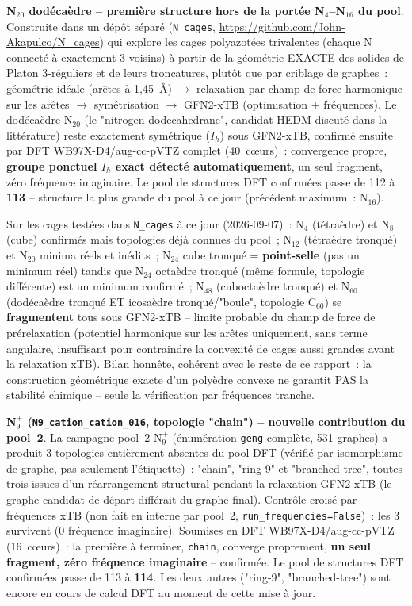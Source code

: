 \documentclass[11pt,a4paper]{article}
\begin{document}
\textbf{N$_{20}$ dod\'eca\`edre -- premi\`ere structure hors de la
port\'ee N$_4$--N$_{16}$ du pool}. Construite dans un d\'ep\^ot s\'epar\'e
(\texttt{N\_cages}, \url{https://github.com/John-Akapulco/N_cages}) qui
explore les cages polyazot\'ees trivalentes (chaque N connect\'e \`a
exactement 3 voisins) \`a partir de la g\'eom\'etrie EXACTE des solides
de Platon 3-r\'eguliers et de leurs troncatures, plut\^ot que par
criblage de graphes~: g\'eom\'etrie id\'eale (ar\^etes \`a 1,45~\AA)
$\to$ relaxation par champ de force harmonique sur les ar\^etes $\to$
sym\'etrisation $\to$ GFN2-xTB (optimisation + fr\'equences). Le
dod\'eca\`edre N$_{20}$ (le "nitrogen dodecahedrane", candidat
HEDM discut\'e dans la litt\'erature) reste exactement sym\'etrique
($I_h$) sous GFN2-xTB, confirm\'e ensuite par DFT WB97X-D4/aug-cc-pVTZ
complet (40~c\oe urs)~: convergence
propre, \textbf{groupe ponctuel $I_h$ exact d\'etect\'e automatiquement},
un seul fragment, z\'ero fr\'equence imaginaire. Le pool de structures
DFT confirm\'ees passe de 112 \`a \textbf{113} -- structure la plus
grande du pool \`a ce jour (pr\'ec\'edent maximum~: N$_{16}$).

Sur les cages test\'ees dans \texttt{N\_cages} \`a ce jour (2026-09-07)~:
N$_4$ (t\'etra\`edre) et N$_8$ (cube) confirm\'es mais topologies d\'ej\`a
connues du pool~; N$_{12}$ (t\'etra\`edre tronqu\'e) et N$_{20}$ minima
r\'eels et in\'edits~; N$_{24}$ cube tronqu\'e = \textbf{point-selle}
(pas un minimum r\'eel) tandis que N$_{24}$ octa\`edre tronqu\'e
(m\^eme formule, topologie diff\'erente) est un minimum confirm\'e~;
N$_{48}$ (cuboctaèdre tronqu\'e) et N$_{60}$ (dod\'eca\`edre tronqu\'e
ET icosa\`edre tronqu\'e/"boule", topologie C$_{60}$) se
\textbf{fragmentent} tous sous GFN2-xTB -- limite probable du champ de
force de pr\'erelaxation (potentiel harmonique sur les ar\^etes
uniquement, sans terme angulaire, insuffisant pour contraindre la
convexit\'e de cages aussi grandes avant la relaxation xTB). Bilan
honn\^ete, coh\'erent avec le reste de ce rapport~: la construction
g\'eom\'etrique exacte d'un polyèdre convexe ne garantit PAS la
stabilit\'e chimique -- seule la v\'erification par fr\'equences
tranche.

\textbf{N$_9^+$ (\texttt{N9\_cation\_cation\_016}, topologie
"chain") -- nouvelle contribution du pool~2}. La campagne pool~2 N$_9^+$
(\'enum\'eration \texttt{geng} compl\`ete, 531 graphes) a produit 3
topologies enti\`erement absentes du pool DFT (v\'erifi\'e par
isomorphisme de graphe, pas seulement l'\'etiquette)~: "chain",
"ring-9" et "branched-tree", toutes trois issues d'un
r\'earrangement structural pendant la relaxation GFN2-xTB (le graphe
candidat de d\'epart diff\'erait du graphe final). Contr\^ole crois\'e
par fr\'equences xTB (non fait en interne par pool~2,
\texttt{run\_frequencies=False})~: les 3 survivent (0 fr\'equence
imaginaire). Soumises en DFT WB97X-D4/aug-cc-pVTZ (16~c\oe urs)~: la
premi\`ere \`a terminer, \texttt{chain}, converge proprement, \textbf{un
seul fragment, z\'ero fr\'equence imaginaire} -- confirm\'ee. Le pool de
structures DFT confirm\'ees passe de 113 \`a \textbf{114}. Les deux
autres ("ring-9", "branched-tree") sont encore en cours de
calcul DFT au moment de cette mise \`a jour.
\end{document}
